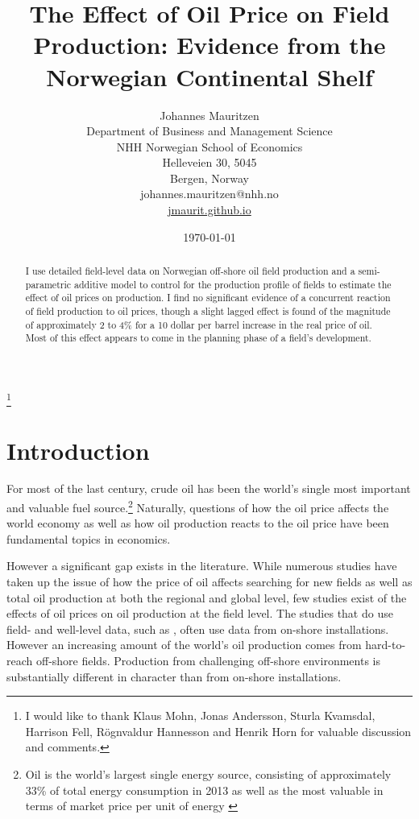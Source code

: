 \documentclass[12pt]{article}
\title{The Effect of Oil Price on Field Production: Evidence from the Norwegian Continental Shelf}
\author{Johannes Mauritzen\\
		Department of Business and Management Science\\
        NHH Norwegian School of Economics\\
        Helleveien 30, 5045\\
        Bergen, Norway\\
        johannes.mauritzen@nhh.no\\
        \url{jmaurit.github.io}\\
		}
\date{\today}
\begin{document}
 \begin{spacing}{1} %
	\maketitle


\begin{abstract}
I use detailed field-level data on Norwegian off-shore oil field production and a semi-parametric additive model to control for the production profile of fields to estimate the effect of oil prices on production.  I find no significant evidence of a concurrent reaction of field production to oil prices, though a slight lagged effect is found of the magnitude of approximately 2 to 4\% for a 10 dollar per barrel increase in the real price of oil.  Most of this effect appears to come in the planning phase of a field's development.
\end{abstract}

\thanks{I would like to thank Klaus Mohn, Jonas Andersson, Sturla Kvamsdal, Harrison Fell, R\"ognvaldur Hannesson and Henrik Horn for valuable discussion and comments.}
 \end{spacing}

\section{Introduction}

For most of the last century, crude oil has been the world’s single most important and valuable fuel source.\footnote{Oil is the world's largest single energy source, consisting of approximately 33\% of total energy consumption in 2013 as well as the most valuable in terms of market price per unit of energy \citep{british_petroleum_statistical_2013}} Naturally, questions of how the oil price affects the world economy as well as how oil production reacts to the oil price have been fundamental topics in economics. 

However a significant gap exists in the literature.  While numerous studies have taken up the issue of how the price of oil affects searching for new fields as well as total oil production at both the regional and global level, few studies exist of the effects of oil prices on oil production at the field level.  The studies that do use field- and well-level data, such as \citet{rao_taxation_2010}, often use data from on-shore installations.  However an increasing amount of the world's oil production comes from hard-to-reach off-shore fields.  Production from challenging off-shore environments is substantially different in character than from on-shore installations.
\end{document}
